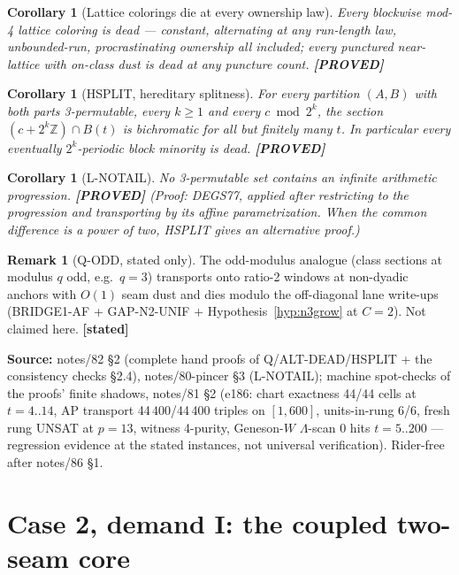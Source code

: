 \documentclass[11pt]{article}
\newtheorem{corollary}[theorem]{Corollary}
\theoremstyle{definition}
\newtheorem{remark}[theorem]{Remark}
\newcommand{\Z}{\mathbb{Z}}
\newcommand{\source}[1]{\par\smallskip\noindent\textbf{Source:} {#1}\par}
\newcommand{\status}[1]{\textbf{[#1]}}
\begin{document}
\begin{corollary}[Lattice colorings die at every ownership law]
\label{cor:lattice}
Every blockwise mod-4 lattice coloring is dead --- constant, alternating at
any run-length law, unbounded-run, procrastinating ownership all included;
every punctured near-lattice with on-class dust is dead at any puncture
count.  \status{PROVED}
\end{corollary}

\begin{corollary}[HSPLIT, hereditary splitness]\label{cor:hsplit}
For every partition $(A,B)$ with both parts 3-permutable, every $k \ge 1$
and every $c \bmod 2^k$, the section $(c + 2^k\Z) \cap B(t)$ is bichromatic
for all but finitely many $t$.  In particular every eventually
$2^k$-periodic block minority is dead.  \status{PROVED}
\end{corollary}

\begin{corollary}[L-NOTAIL]\label{cor:notail}
No 3-permutable set contains an infinite arithmetic progression.
\status{PROVED} \emph{(Proof: DEGS77, applied after restricting to
the progression and transporting by its affine parametrization.  When the
common difference is a power of two, HSPLIT gives an alternative proof.)}
\end{corollary}

\begin{remark}[Q-ODD, stated only]\label{rem:qodd}
The odd-modulus analogue (class sections at modulus $q$ odd, e.g.\ $q = 3$)
transports onto ratio-2 windows at non-dyadic anchors with $O(1)$ seam dust
and dies modulo the off-diagonal lane write-ups (BRIDGE1-AF + GAP-N2-UNIF
$+$ Hypothesis~\ref{hyp:n3grow} at $C = 2$).  Not claimed here.
\status{stated}
\end{remark}

\source{notes/82 \S2 (complete hand proofs of Q/ALT-DEAD/HSPLIT + the
consistency checks \S2.4), notes/80-pincer \S3 (L-NOTAIL); machine
spot-checks of the proofs' finite shadows, notes/81 \S2 (e186: chart
exactness 44/44 cells at $t = 4..14$, AP transport 44\,400/44\,400
triples on $[1,600]$, units-in-rung 6/6, fresh rung UNSAT at $p=13$,
witness 4-purity, Geneson-$W$ $\Lambda$-scan 0 hits $t = 5..200$ ---
regression evidence at the stated instances, not universal
verification).  Rider-free after notes/86 \S1.}

\section{Case 2, demand I: the coupled two-seam core}\label{sec:core}
\end{document}

